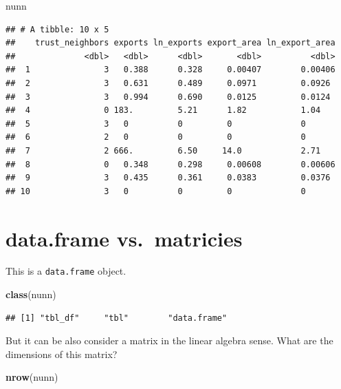 \documentclass[]{book}
\newenvironment{Shaded}{\begin{snugshade}}{\end{snugshade}}
\newcommand{\KeywordTok}[1]{\textcolor[rgb]{0.13,0.29,0.53}{\textbf{#1}}}
\newcommand{\NormalTok}[1]{#1}
\theoremstyle{definition}
\theoremstyle{definition}
\theoremstyle{definition}
\theoremstyle{remark}
\begin{document}
\begin{Shaded}
\begin{Highlighting}[]
\NormalTok{nunn}
\end{Highlighting}
\end{Shaded}

\begin{verbatim}
## # A tibble: 10 x 5
##    trust_neighbors exports ln_exports export_area ln_export_area
##              <dbl>   <dbl>      <dbl>       <dbl>          <dbl>
##  1               3   0.388      0.328     0.00407        0.00406
##  2               3   0.631      0.489     0.0971         0.0926 
##  3               3   0.994      0.690     0.0125         0.0124 
##  4               0 183.         5.21      1.82           1.04   
##  5               3   0          0         0              0      
##  6               2   0          0         0              0      
##  7               2 666.         6.50     14.0            2.71   
##  8               0   0.348      0.298     0.00608        0.00606
##  9               3   0.435      0.361     0.0383         0.0376 
## 10               3   0          0         0              0
\end{verbatim}

\hypertarget{data.frame-vs.matricies}{%
\section{data.frame vs.~matricies}\label{data.frame-vs.matricies}}

This is a \texttt{data.frame} object.

\begin{Shaded}
\begin{Highlighting}[]
\KeywordTok{class}\NormalTok{(nunn)}
\end{Highlighting}
\end{Shaded}

\begin{verbatim}
## [1] "tbl_df"     "tbl"        "data.frame"
\end{verbatim}

But it can be also consider a matrix in the linear algebra sense. What are the dimensions of this matrix?

\begin{Shaded}
\begin{Highlighting}[]
\KeywordTok{nrow}\NormalTok{(nunn)}
\end{Highlighting}
\end{Shaded}
\end{document}
